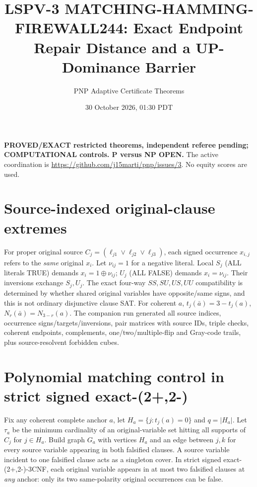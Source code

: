 \documentclass[10pt]{article}
\title{LSPV-3 MATCHING-HAMMING-FIREWALL244: Exact Endpoint Repair Distance and a UP-Dominance Barrier}
\author{PNP Adaptive Certificate Theorems}
\date{30 October 2026, 01:30 PDT}
\begin{document}
\maketitle
\noindent\textbf{PROVED/EXACT restricted theorems, independent referee pending; COMPUTATIONAL controls. P versus NP OPEN.}
The active coordination is \url{https://github.com/j15marti/pnp/issues/3}. No equity scores are used.

\section{Source-indexed original-clause extremes}
For proper original source $C_j=(\ell_{j1}\vee\ell_{j2}\vee\ell_{j3})$, each signed occurrence $x_{i,j}$ refers to the \emph{same} original $x_i$. Let $\nu_{ij}=1$ for a negative literal. Local $S_j$ (ALL literals TRUE) demands $x_i=1\oplus\nu_{ij}$; $U_j$ (ALL FALSE) demands $x_i=\nu_{ij}$. Their inversions exchange $S_j,U_j$. The exact four-way $SS,SU,US,UU$ compatibility is determined by whether shared original variables have opposite/same signs, and this is not ordinary disjunctive clause SAT. For coherent $a$, $t_j(\bar a)=3-t_j(a)$, $N_r(\bar a)=N_{3-r}(a)$. The companion run generated all source indices, occurrence signs/targets/inversions, pair matrices with source IDs, triple checks, coherent endpoints, complements, one/two/multiple-flip and Gray-code trails, plus source-resolvent forbidden cubes.

\section{Polynomial matching control in strict signed exact-(2+,2-)}
Fix any coherent complete anchor $a$, let $H_a=\{j:t_j(a)=0\}$ and $q=|H_a|$. Let $\tau_a$ be the minimum cardinality of an original-variable set hitting all supports of $C_j$ for $j\in H_a$. Build graph $G_a$ with vertices $H_a$ and an edge between $j,k$ for every source variable appearing in both falsified clauses. A source variable incident to one falsified clause acts as a singleton cover. In strict signed exact-(2+,2-)-3CNF, each original variable appears in at most two falsified clauses at \emph{any} anchor: only its two same-polarity original occurrences can be false.
\end{document}
